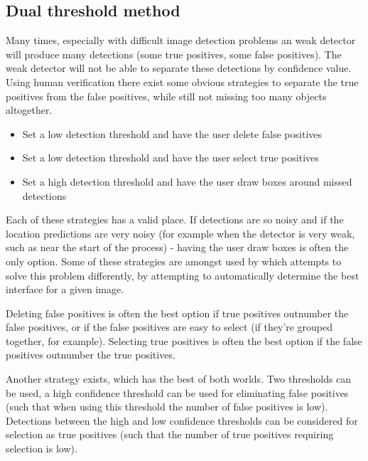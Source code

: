 \subsection{Dual threshold method}

 Many times, especially with difficult image detection problems an weak detector will produce many detections (some true positives, some false positives). The weak detector will not be able to separate these detections by confidence value. Using human verification there exist some obvious strategies to separate the true positives from the false positives, while still not missing too many objects altogether. 

\begin{itemize}
    \item Set a low detection threshold and have the user delete false positives
    \item Set a low detection threshold and have the user select true positives
    \item Set a high detection threshold and have the user draw boxes around missed detections
\end{itemize}

Each of these strategies has a valid place. If detections are so noisy and if the location predictions are very noisy (for example when the detector is very weak, such as near the start of the process) - having the user draw boxes is often the only option. Some of these strategies are amongst used by \cite{Konyushkova2017} which attempts to solve this problem differently, by attempting to automatically determine the best interface for a given image.

Deleting false positives is often the best option if true positives outnumber the false positives, or if the false positives are easy to select (if they're grouped together, for example). Selecting true positives is often the best option if the false positives outnumber the true positives. 

Another strategy exists, which has the best of both worlds. Two thresholds can be used, a high confidence threshold can be used for eliminating false positives (such that when using this threshold the number of false positives is low). Detections between the high and low confidence thresholds can be considered for selection as true positives (such that the number of true positives requiring selection is low).


